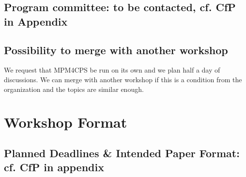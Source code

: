 \subsection{Program committee: to be contacted, cf. CfP in Appendix}

\subsection{Possibility to merge with another workshop}
We request that MPM4CPS be run on its own and we plan half a day of discussions.
We can merge with another workshop if this is a condition from the organization 
and the topics are similar enough.

\section{Workshop Format}
\subsection{Planned Deadlines \& Intended Paper Format: cf. CfP in appendix}

